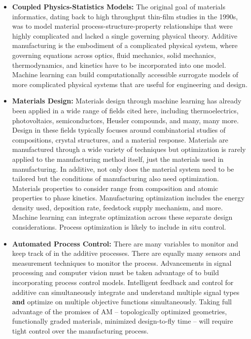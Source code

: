 \begin{itemize}
	\item \textbf{Coupled Physics-Statistics Models:} The original goal of materials informatics, dating back to high throughput thin-film studies in the 1990s, was to model material process-structure-property relationships that were highly complicated and lacked a single governing physical theory. Additive manufacturing is the embodiment of a complicated physical system, where governing equations across optics, fluid mechanics, solid mechanics, thermodynamics, and kinetics have to be incorporated into one model. Machine learning can build computationally accessible surrogate models of more complicated physical systems that are useful for engineering and design. 
	
	\item \textbf{Materials Design:} Materials design through machine learning has already been applied in a wide range of fields cited here, including thermoelectrics, photovoltaics, semiconductors, Heusler compounds, and many, many more. Design in these fields typically focuses around combinatorial studies of compositions, crystal structures, and a material response. Materials are manufactured through a wide variety of techniques but optimization is rarely applied to the manufacturing method itself, just the materials used in manufacturing. In additive, not only does the material system need to be tailored but the conditions of manufacturing also need optimization. Materials properties to consider range from composition and atomic properties to phase kinetics. Manufacturing optimization includes the energy density used, deposition rate, feedstock supply mechanism, and more. Machine learning can integrate optimization across these separate design considerations. Process optimization is likely to include in situ control.
	
	\item \textbf{Automated Process Control:} There are many variables to monitor and keep track of in the additive processes. There are equally many sensors and measurement techniques to monitor the process. Advancements in signal processing and computer vision must be taken advantage of to build incorporating process control models. Intelligent feedback and control for additive can simultaneously integrate and understand multiple signal types \textbf{and} optimize on multiple objective functions simultaneously. Taking full advantage of the promises of AM -- topologically optimized geometries, functionally graded materials, minimized design-to-fly time -- will require tight control over the manufacturing process.
\end{itemize}

